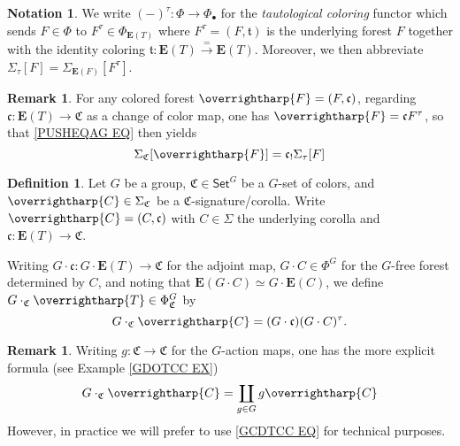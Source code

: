 \documentclass[a4paper,10pt
,draft
]{article}%
\numberwithin{equation}{section}
\numberwithin{figure}{section}
\theoremstyle{definition} %
\newtheorem{definition}[equation]{Definition}%
\newtheorem{remark}[equation]{Remark}%
\newtheorem{notation}[equation]{Notation}%
\newcommand{\vect}[1]{\text{\overrightharp{\ensuremath{#1}}}}
\newcommand{\1}{\ensuremath{\mathbbm 1}}%
\begin{document}
\begin{notation}
	We write $(-)^{\tau} \colon \Phi \to \Phi_{\bullet}$
	for the \emph{tautological coloring} functor
	which sends $F \in \Phi$ to 
	$F^{\tau} \in \Phi_{\boldsymbol{E}(T)}$
	where
	$F^{\tau} = (F,\mathfrak{t})$ is the underlying forest $F$
	together with the identity coloring
	$\mathfrak{t} \colon \boldsymbol{E}(T) \xrightarrow{=} \boldsymbol{E}(T)$.
	Moreover, we then abbreviate 
	$\Sigma_{\tau}[F] = \Sigma_{\boldsymbol{E}(F)}[F^{\tau}]$.
\end{notation}


\begin{remark}
	For any colored forest $\vect{F}=(F,\mathfrak{c})$,
	regarding $\mathfrak{c} \colon \boldsymbol{E}(T) \to \mathfrak{C}$
	as a change of color map, 
	one has $\vect{F} = \mathfrak{c} F^{\tau}$,
	so that \eqref{PUSHEQAG EQ} then yields 
	\begin{equation}\label{CANPUSH EQ}
	\Sigma_{\mathfrak{C}}[\vect{F}] = 
	\mathfrak{c}_! \Sigma_{\tau}[F]
	\end{equation}
\end{remark}


\begin{definition}
	Let $G$ be a group,
	$\mathfrak{C} \in \mathsf{Set}^G$
	be a $G$-set of colors, 
	and $\vect{C} \in \Sigma_{\mathfrak{C}}$ be a $\mathfrak{C}$-signature/corolla.
	Write
	$\vect{C} = (C,\mathfrak{c})$
	with $C\in \Sigma$ the underlying corolla
	and 
	$\mathfrak{c} \colon \boldsymbol{E}(T) \to \mathfrak{C}$.
	
	Writing 
	$G \cdot \mathfrak{c} \colon G \cdot \boldsymbol{E}(T) \to \mathfrak{C}$
	for the adjoint map, 
	$G \cdot C \in \Phi^G$
	for the $G$-free forest determined by $C$,
	and noting that
	$\boldsymbol{E}(G \cdot C) \simeq 
	G \cdot \boldsymbol{E}(C)$,
	we define $G \cdot_{\mathfrak{C}} \vect{T} \in \Phi^G_{\mathfrak{C}}$ by
	\begin{equation}\label{GCDTCC EQ}
	G \cdot_{\mathfrak{C}} \vect{C} = 
	(G \cdot \mathfrak{c})(G \cdot C)^{\tau}.
	\end{equation}
\end{definition}



\begin{remark}
	Writing $g \colon \mathfrak{C} \to \mathfrak{C}$
	for the $G$-action maps,
	one has the more explicit formula 
	(see Example \ref{GDOTCC EX})
	\[
	G \cdot_{\mathfrak{C}} \vect{C}
	= 
	\coprod_{g \in G}
	g \vect{C}
	\]
	However, in practice we will prefer to use 
	\eqref{GCDTCC EQ} for technical purposes.
\end{remark}
\end{document}
